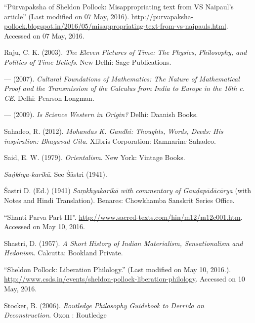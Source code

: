 \begin{thebibliography}{99}
``Pūrvapaksha of Sheldon Pollock: Misappropriating text from VS Naipaul's article'' (Last modified on 07 May, 2016). \url{http://purvapaksha-pollock.blogspot.in/2016/05/misappropriating-text-from-vs-naipauls.html}. Accessed on 07 May, 2016.

Raju, C. K. (2003). {\sl The Eleven Pictures of Time: The Physics, Philosophy, and Politics of Time Beliefs}. New Delhi: Sage Publications.

--- (2007). {\sl Cultural Foundations of Mathematics: The Nature of Mathematical Proof and the Transmission of the Calculus from India to Europe in the 16th c. CE}. Delhi: Pearson Longman.

--- (2009). {\sl Is Science Western in Origin?} Delhi: Daanish Books.

Sahadeo, R. (2012). {\sl Mohandas K. Gandhi: Thoughts, Words, Deeds: His inspiration: Bhagavad-Gita}. Xlibris Corporation: Ramnarine Sahadeo.

Said, E. W. (1979). {\sl Orientalism}. New York: Vintage Books.

{\sl Saṇ̇khya-karikā}. See Śāstri (1941).

Śastri D. (Ed.) (1941) {\sl Saṃkhyakarikā with commentary of Gauḍapādācārya} (with Notes and Hindi Translation). Benares: Chowkhamba Sanskrit Series Office.

``Shanti Parva Part III''. \url{http://www.sacred-texts.com/hin/m12/m12c001.htm}. Accessed on May 10, 2016.

Shastri, D. (1957). {\sl A Short History of Indian Materialism, Sensationalism and Hedonism}. Calcutta: Bookland Private.

``Sheldon Pollock: Liberation Philology.'' (Last modified on May 10, 2016.). \url{http://www.csds.in/events/sheldon-pollock-liberation-philology}. Accessed on 10 May, 2016.

Stocker, B. (2006). {\sl Routledge Philosophy Guidebook to Derrida on Deconstruction}. Oxon : Routledge

\end{thebibliography}

\theendnotes
\label{chapter\thechapter:end}
